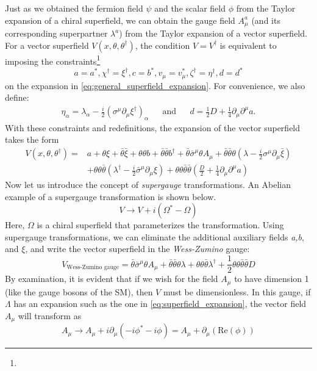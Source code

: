 Just as we obtained the fermion field $\psi$ and the scalar field $\phi$ from the Taylor expansion of a chiral superfield, we can obtain the gauge field $A_\mu^a$ (and its corresponding superpartner $\lambda^a$) from the Taylor expansion of a vector superfield.
For a vector superfield $V(x,\theta,\theta^\dagger)$, the condition $V = V^\dagger$ is equivalent to imposing the constraints\footnote{}
\[a = a^*, \chi^\dagger = \xi^\dagger, c = b^*, v_\mu = v_\mu^*, \zeta^\dagger = \eta^\dagger, d = d^*\]
on the expansion in \eqref{eq:general_superfield_expansion}.
For convenience, we also define:
\begin{align*}
  \eta_\alpha = \lambda_\alpha-\frac{i}{2}(\sigma^\mu\partial_\mu\xi^\dagger)_\alpha&&\text{and}&& d = \frac{1}{2}D+\frac{1}{4}\partial_\mu\partial^\mu a.
\end{align*}
With these constraints and redefinitions, the expansion of the vector superfield takes the form 
\begin{align*}
  V(x,\theta,\theta^\dagger) =& a + \theta\xi + \bar{\theta}\bar{\xi} + \theta\theta b+\bar{\theta}\bar{\theta}b^\dagger + \bar{\theta}\bar{\sigma}^\mu\theta A_\mu + \bar{\theta}\bar{\theta}\theta\left(\lambda-\frac{i}{2}\sigma^\mu\partial_\mu\bar{\xi}\right)\\
  &+\theta\theta\bar{\theta}\left(\lambda^\dagger-\frac{i}{2}\bar{\sigma}^\mu\partial_\mu\xi\right)+\theta\theta\bar{\theta}\bar{\theta}\left(\frac{D}{2}+\frac{1}{4}\partial_\mu\partial^\mu a \right)
\end{align*}
Now let us introduce the concept of \emph{supergauge} transformations. An Abelian example of a supergauge transformation is shown below.
\[V\rightarrow V+i(\Omega^*-\Omega)\]
Here, $\Omega$ is a chiral superfield that parameterizes the transformation.
Using supergauge transformations, we can eliminate the additional auxiliary fields \emph{a,b}, and $\xi$, and write the vector superfield in the \emph{Wess-Zumino} gauge:
\[V_{\text{Wess-Zumino gauge}} = \bar{\theta}\bar{\sigma}^\mu\theta A_\mu + \bar{\theta}\bar{\theta}\theta\lambda+\theta\theta\bar{\theta}\lambda^\dagger + \frac{1}{2}\theta\theta\bar{\theta}\bar{\theta}D\]
By examination, it is evident that if we wish for the field $A_\mu$ to have dimension 1 (like the gauge bosons of the SM), then $V$ must be dimensionless. In this gauge, if $\Lambda$ has an expansion such as the one in \eqref{eq:superfield_expansion}, the vector field $A_\mu$ will transform as
\begin{equation}
A_\mu\rightarrow A_\mu + i\partial_{\mu}(-i\phi^*-i\phi) = A_\mu + \partial_\mu( \text{Re}(\phi))
\label{eq:amu_supergauge_transformation}
\end{equation}
